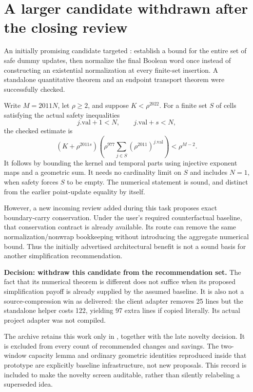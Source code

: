 \section{A larger candidate withdrawn after the closing review}
\label{sec:withdrawn}
An initially promising candidate targeted : establish a bound for the entire set of safe dummy updates, then normalize the final Boolean word once instead of constructing an existential normalization at every finite-set insertion. A standalone quantitative theorem and an endpoint transport theorem were successfully checked.

Write $M=2011N$, let $\rho\ge2$, and suppose $K<\rho^{2022}$. For a finite set $S$ of cells satisfying the actual safety inequalities
\[
 j.\mathrm{val}+1<N,\qquad j.\mathrm{val}+s<N,
\]
the checked estimate is
\[
 (K+\rho^{2011s})\left(\rho^{977}\sum_{j\in S}
       (\rho^{2011})^{j.\mathrm{val}}\right)<\rho^{M-2}.
\]
It follows by bounding the kernel and temporal parts using injective exponent maps and a geometric sum. It needs no cardinality limit on $S$ and includes $N=1$, when safety forces $S$ to be empty. The numerical statement is sound, and distinct from the earlier point-update equality by itself.

However, a new incoming review added during this task proposes exact boundary-carry conservation. Under the user's required counterfactual baseline, that conservation contract is already available. Its route can remove the same normalization/nonwrap bookkeeping without introducing the aggregate numerical bound. Thus the initially advertised architectural benefit is not a sound basis for another simplification recommendation.

\textbf{Decision: withdraw this candidate from the recommendation set.} The fact that its numerical theorem is different does not suffice when its proposed simplification payoff is already supplied by the assumed baseline. It is also not a source-compression win as delivered: the client adapter removes 25 lines but the standalone helper costs 122, yielding 97 extra lines if copied literally. Its actual project adapter was not compiled.

The archive retains this work only in , together with the late novelty decision. It is excluded from every count of recommended changes and savings. The two-window capacity lemma and ordinary geometric identities reproduced inside that prototype are explicitly baseline infrastructure, not new proposals. This record is included to make the novelty screen auditable, rather than silently relabeling a superseded idea.
